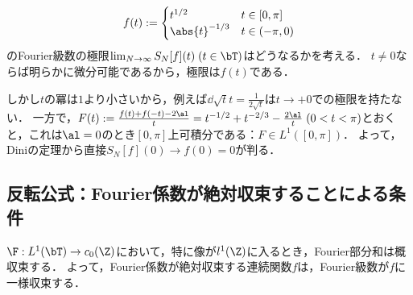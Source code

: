 \documentclass[uplatex,dvipdfmx]{jsreport}
\begin{document}
\begin{observation}
    \[f(t):=\begin{cases}
        t^{1/2}&t\in[0,\pi]\\
        \abs{t}^{-1/3}&t\in(-\pi,0)
    \end{cases}\]
    のFourier級数の極限$\lim_{N\to\infty}S_N[f](t)\;(t\in\bT)$はどうなるかを考える．
    $t\ne0$ならば明らかに微分可能であるから，極限は$f(t)$である．

    しかし$t$の冪は$1$より小さいから，例えば$\dd{\sqrt{t}}{t}=\frac{1}{2\sqrt{t}}$は$t\to+0$での極限を持たない．
    一方で，$F(t):=\frac{f(t)+f(-t)-2\al}{t}=t^{-1/2}+t^{-2/3}-\frac{2\al}{t}\;(0<t<\pi)$とおくと，これは$\al=0$のとき$[0,\pi]$上可積分である：$F\in L^1([0,\pi])$．
    よって，Diniの定理から直接$S_N[f](0)\to f(0)=0$が判る．
\end{observation}

\subsection{反転公式：Fourier係数が絶対収束することによる条件}

\begin{tcolorbox}[colframe=ForestGreen, colback=ForestGreen!10!white,breakable,colbacktitle=ForestGreen!40!white,coltitle=black,fonttitle=\bfseries\sffamily,
title=]
    $\F:L^1(\bT)\to c_0(\Z)$において，特に像が$l^1(\Z)$に入るとき，Fourier部分和は概収束する．
    よって，Fourier係数が絶対収束する連続関数$f$は，Fourier級数が$f$に一様収束する．
\end{tcolorbox}
\end{document}
